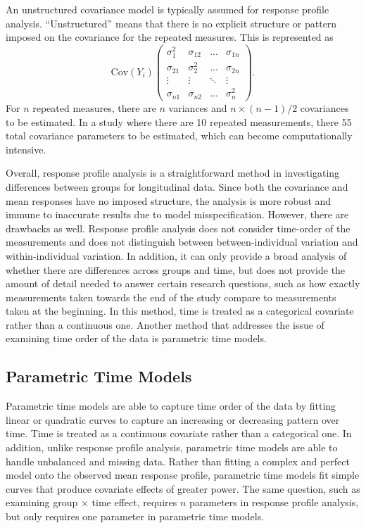 \documentclass[12pt, twoside]{amherstthesis}
\begin{document}
An unstructured covariance model is typically assumed for response profile analysis. ``Unstructured'' means that there is no explicit structure or pattern imposed on the covariance for the repeated measures. This is represented as \[\text{Cov}(Y_i) \begin{pmatrix} \sigma_1^2 &\sigma_{12} & ...& \sigma_{1n} \\ \sigma_{21} &\sigma_2^2 & ... & \sigma_{2n} \\ \vdots & \vdots & \ddots & \vdots \\ \sigma_{n1} & \sigma_{n2} & ... & \sigma_n^2\end{pmatrix}.\] For \(n\) repeated measures, there are \(n\) variances and \(n \times (n-1)/2\) covariances to be estimated. In a study where there are 10 repeated measurements, there 55 total covariance parameters to be estimated, which can become computationally intensive.

Overall, response profile analysis is a straightforward method in investigating differences between groups for longitudinal data. Since both the covariance and mean responses have no imposed structure, the analysis is more robust and immune to inaccurate results due to model misspecification. However, there are drawbacks as well. Response profile analysis does not consider time-order of the measurements and does not distinguish between between-individual variation and within-individual variation. In addition, it can only provide a broad analysis of whether there are differences across groups and time, but does not provide the amount of detail needed to answer certain research questions, such as how exactly measurements taken towards the end of the study compare to measurements taken at the beginning. In this method, time is treated as a categorical covariate rather than a continuous one. Another method that addresses the issue of examining time order of the data is parametric time models.

\hypertarget{parametric-time-models}{%
\subsection{Parametric Time Models}\label{parametric-time-models}}

Parametric time models are able to capture time order of the data by fitting linear or quadratic curves to capture an increasing or decreasing pattern over time. Time is treated as a continuous covariate rather than a categorical one. In addition, unlike response profile analysis, parametric time models are able to handle unbalanced and missing data. Rather than fitting a complex and perfect model onto the observed mean response profile, parametric time models fit simple curves that produce covariate effects of greater power. The same question, such as examining group \(\times\) time effect, requires \(n\) parameters in response profile analysis, but only requires one parameter in parametric time models.
\end{document}
